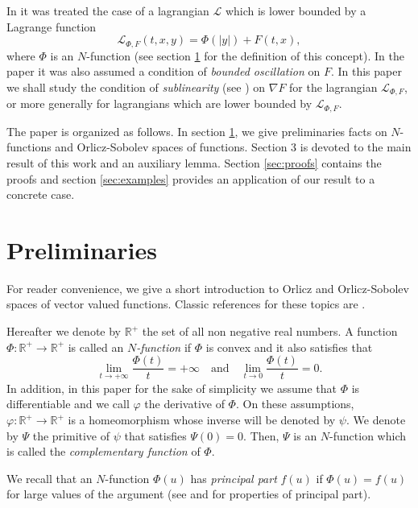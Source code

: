 \documentclass[twoside]{article}
\theoremstyle{remark}
\newcounter{example}
\begin{document}
In \cite{ABGMS2015} it was treated  the case of a lagrangian $\mathcal{L}$ which is lower bounded by a Lagrange function
\begin{equation}\label{eq:lagrange_phi}
\mathcal{L}_{\Phi,F}(t,x,y)=\Phi(|y|)+F(t,x),
\end{equation}
where  $\Phi$ is an $N$-function (see section \ref{preliminares} for the definition of this concept).  
In the paper \cite{ABGMS2015} it was also assumed  a condition of \emph{bounded oscillation} on $F$. In this paper we shall study the condition of \emph{sublinearity} (see  \cite{tang1998periodic,wu1999periodic,zhao2004periodic,tang2010periodic,zhao2005existence}) on $\nabla F$ for the lagrangian  $\mathcal{L}_{\Phi,F}$, or more generally for lagrangians which are lower bounded by $\mathcal{L}_{\Phi,F}$.




The paper is organized as follows. In section \ref{preliminares}, we give preliminaries facts on $N$-functions and Orlicz-Sobolev spaces of functions. Section 3 is devoted to the main result of this work and an auxiliary lemma. Section \ref{sec:proofs} contains the proofs and section \ref{sec:examples} provides an application of our result to a concrete case.
 

\section{Preliminaries}\label{preliminares}

For reader convenience, we give a short introduction to Orlicz and Orlicz-Sobolev spaces of vector valued functions. Classic references for these topics are \cite{adams_sobolev,KR,rao1991theory,M}. 

Hereafter we denote  by $\mathbb{R}^+$  the set of all non negative real numbers. A function $\Phi:\mathbb{R}^+\to \mathbb{R}^+ $ is called an \emph{$N$-function} if $\Phi$ is convex and it also satisfies that
\[
\lim_{t\to+\infty}\frac{\Phi(t)}{t}=+\infty\quad\text{and}\quad \lim_{t\to 0}\frac{\Phi(t)}{t}=0.
\]
In addition,  in this paper for the sake of simplicity  we assume that $\Phi$ is differentiable and we call $\varphi$  the derivative of $\Phi$. 
On these assumptions, $\varphi:\mathbb{R}^+\rightarrow \mathbb{R}^+$ is a homeomorphism whose inverse will be denoted by $\psi$. 
We denote by $\Psi$ the primitive of $\psi$ that satisfies $\Psi(0)=0$. Then, $\Psi$ is an $N$-function which  is called the \emph{complementary function} of $\Phi$.

 We recall that an $N$-function $\Phi(u)$ has \emph{principal part} $f(u)$ if $\Phi(u)=f(u)$ for large values of the argument (see \cite[p. 16]{KR} and \cite[Sec. 7]{KR} for  properties of principal part).
\end{document}
